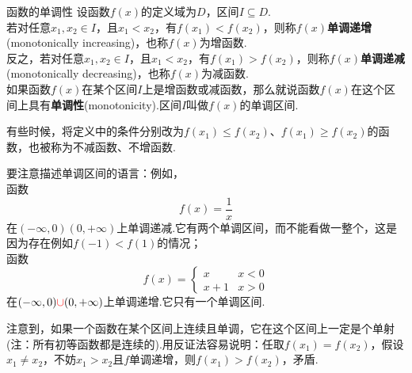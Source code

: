 \documentclass[lang=cn, zihao=5]{elegantbook}
\begin{document}
\begin{definition}{函数的单调性} %
    设函数$f(x)$的定义域为$D$，区间$I \subseteq D$.\\
    若对任意$x_1,x_2 \in I$，且$x_1 < x_2$，有$f(x_1) < f(x_2)$，则称$f(x)$\textbf{单调递增}(monotonically increasing)，也称$f(x)$为增函数.\\
    反之，若对任意$x_1,x_2 \in I$，且$x_1 < x_2$，有$f(x_1) > f(x_2)$，则称$f(x)$\textbf{单调递减}(monotonically decreasing)，也称$f(x)$为减函数.\\
    如果函数$f(x)$在某个区间$I$上是增函数或减函数，那么就说函数$f(x)$在这个区间上具有\textbf{单调性}(monotonicity).区间$I$叫做$f(x)$的单调区间.
\end{definition}
\begin{remark}
    有些时候，将定义中的条件分别改为$f(x_1) \leq f(x_2)$、$f(x_1) \geq f(x_2)$的函数，也被称为不减函数、不增函数.
\end{remark}
\begin{note}
    要注意描述单调区间的语言：例如，\\
    函数$$f(x)=\frac{1}{x}$$
    在$(- \infty , 0)$\color{red}{和}\color{black}$(0 , + \infty)$上单调递减.它有两个单调区间，而不能看做一整个，这是因为存在例如$f(-1) < f(1)$的情况；\\
    函数$$ f(x)=\begin{cases}
    	x &x<0 \\
    	x+1 &x>0
    \end{cases}$$
    在$(- \infty , 0) \color{red}{\cup}\color{black} (0 , + \infty)$上单调递增.它只有一个单调区间.
\end{note}

注意到，如果一个函数在某个区间上连续且单调，它在这个区间上一定是个单射(注：所有初等函数都是连续的).用反证法容易说明：任取$f(x_1)=f(x_2)$，假设$x_1 \neq x_2$，不妨$x_1 > x_2$且$f$单调递增，则$f(x_1) > f(x_2)$，矛盾.
\end{document}
